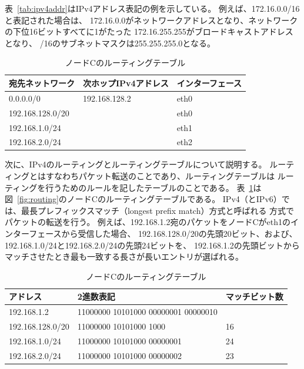 表~\ref{tab:ipv4addr}はIPv4アドレス表記の例を示している。
例えば、172.16.0.0/16と表記された場合は、
172.16.0.0がネットワークアドレスとなり、ネットワークの下位16ビットすべてに1がたった
172.16.255.255がブロードキャストアドレスとなり、
/16のサブネットマスクは255.255.255.0となる。

\begin{table}
    \centering
    \caption{ノードCのルーティングテーブル} \label{tab:rttable}
    \begin{tabular}{lll}
        宛先ネットワーク & 次ホップIPv4アドレス & インターフェース \\ \hline
        0.0.0.0/0 & 192.168.128.2 & eth0 \\
        192.168.128.0/20 & & eth0 \\
        192.168.1.0/24 & & eth1 \\
        192.168.2.0/24 & & eth2 \\
    \end{tabular}
\end{table}

次に、IPv4のルーティングとルーティングテーブルについて説明する。
ルーティングとはすなわちパケット転送のことであり、ルーティングテーブルは
ルーティングを行うためのルールを記したテーブルのことである。
表~\ref{tab:rttable}は図~\ref{fig:routing}のノードCのルーティングテーブルである。
IPv4（とIPv6）では、最長プレフィックスマッチ（longest prefix match）方式と呼ばれる
方式でパケットの転送を行う。
例えば、192.168.1.2宛のパケットをノードCがeth1のインターフェースから受信した場合、
192.168.128.0/20の先頭20ビット、および、
192.168.1.0/24と192.168.2.0/24の先頭24ビットを、
192.168.1.2の先頭ビットからマッチさせたとき最も一致する長さが長いエントリが選ばれる。

\begin{table}
    \centering
    \caption{ノードCのルーティングテーブル} \label{tab:longestm}
    \begin{tabular}{lll}
        アドレス & 2進数表記 & マッチビット数 \\ \hline
        192.168.1.2 & 11000000 10101000 00000001 00000010 & \\ \hline
        192.168.128.0/20 & {\color{red}11000000 10101000} 1000 & 16 \\
        192.168.1.0/24 & {\color{red}11000000 10101000 00000001} & 24 \\
        192.168.2.0/24 & {\color{red}11000000 10101000 0000000}2 & 23 \\
    \end{tabular}
\end{table}

